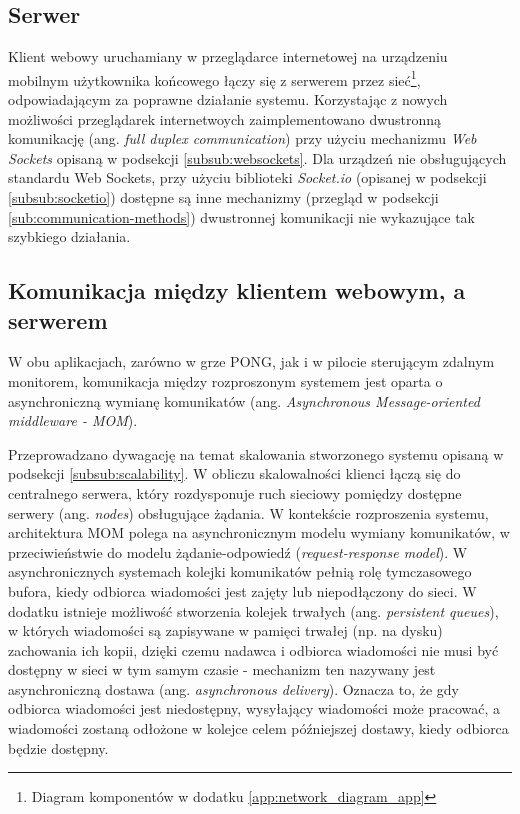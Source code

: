 \subsection{Serwer}

Klient webowy uruchamiany w przeglądarce internetowej na urządzeniu mobilnym użytkownika końcowego łączy się z serwerem przez sieć\footnote{Diagram komponentów w dodatku \ref{app:network_diagram_app}}, odpowiadającym za poprawne działanie systemu. Korzystając z nowych możliwości przeglądarek internetwoych zaimplementowano dwustronną komunikację (ang. \emph{full duplex communication}) przy użyciu mechanizmu \emph{Web Sockets}\cite{websockets-rfc} opisaną w podsekcji \ref{subsub:websockets}. Dla urządzeń nie obsługujących standardu Web Sockets, przy użyciu biblioteki \emph{Socket.io} (opisanej w podsekcji \ref{subsub:socketio}) dostępne są inne mechanizmy (przegląd w podsekcji \ref{sub:communication-methods}) dwustronnej komunikacji nie wykazujące tak szybkiego działania.

\subsection{Komunikacja między klientem webowym, a serwerem}

W obu aplikacjach, zarówno w grze PONG, jak i w pilocie sterującym zdalnym monitorem, komunikacja między rozproszonym systemem jest oparta o asynchroniczną wymianę komunikatów (ang. \emph{Asynchronous Message-oriented middleware - MOM})\cite{message-oriented-middleware}.

Przeprowadzano dywagację na temat skalowania stworzonego systemu opisaną w podsekcji \ref{subsub:scalability}. W obliczu skalowalności klienci łączą się do centralnego serwera, który rozdysponuje ruch sieciowy pomiędzy dostępne serwery (ang. \emph{nodes}) obsługujące żądania. W kontekście rozproszenia systemu, architektura MOM polega na asynchronicznym modelu wymiany komunikatów, w przeciwieństwie do modelu żądanie-odpowiedź (\emph{request-response model}). W asynchronicznych systemach kolejki komunikatów pełnią rolę tymczasowego bufora, kiedy odbiorca wiadomości jest zajęty lub niepodłączony do sieci. W dodatku istnieje możliwość stworzenia kolejek trwałych (ang. \emph{persistent queues}), w których wiadomości są zapisywane w pamięci trwałej (np. na dysku) zachowania ich kopii, dzięki czemu nadawca i odbiorca wiadomości nie musi być dostępny w sieci w tym samym czasie - mechanizm ten nazywany jest asynchroniczną dostawa (ang. \emph{asynchronous delivery}). Oznacza to, że gdy odbiorca wiadomości jest niedostępny, wysyłający wiadomości może pracować, a wiadomości zostaną odłożone w kolejce celem późniejszej dostawy, kiedy odbiorca będzie dostępny.

